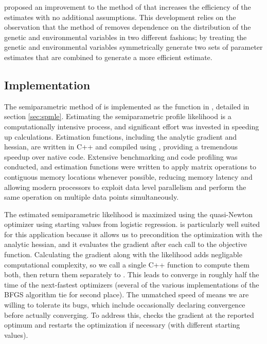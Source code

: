 \documentclass[nojss]{jss}
\begin{document}
\citet{Wang2018unpublished} proposed an improvement to the method of
\citet{Stalder2017} that increases the efficiency of the estimates with
no additional assumptions. This development relies on the observation
that the method of \citeauthor{Stalder2017} removes dependence on the
distribution of the genetic and environmental variables in two different
fashions; by treating the genetic and environmental variables
symmetrically \citeauthor{Wang2018unpublished} generate two sets of
parameter estimates that are combined to generate a more efficient
estimate.

\subsection{Implementation}

The semiparametric method of \citet{Stalder2017} is implemented as the
function  in , detailed in section
\ref{sec:spmle}. Estimating the semiparametric profile likelihood is a
computationally intensive process, and significant effort was invested
in speeding up calculations. Estimation functions, including the
analytic gradient and hessian, are written in C++ and compiled using
 \citep{Eddelbuettel2013Rcpp}, providing a tremendous speedup
over native  code. Extensive benchmarking and code profiling
was conducted, and estimation functions were written to apply matrix
operations to contiguous memory locations whenever possible, reducing
memory latency and allowing modern processors to exploit data level
parallelism and perform the same operation on multiple data points
simultaneously.

The estimated semiparametric likelihood is maximized using the
quasi-Newton optimizer  \citep{Nielsen2016ucminf} using
starting values from logistic regression.  is particularly
well suited for this application because it allows us to precondition
the optimization with the analytic hessian, and it evaluates the
gradient after each call to the objective function. Calculating the
gradient along with the likelihood adds negligable computational
complexity, so we call a single C++ function to compute them both, then
return them separately to . This leads  to
converge in roughly half the time of the next-fastest optimizers
(several of the various  implementations of the BFGS
algorithm tie for second place). The unmatched speed of 
means we are willing to tolerate its bugs, which include occasionally
declaring convergence before actually converging. To address this,
 checks the gradient at the reported optimum and restarts
the optimization if necessary (with different starting values).
\end{document}

